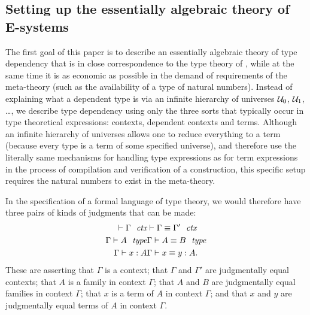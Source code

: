 \subsection*{Setting up the essentially algebraic theory of E-systems}
The first goal of this paper is to describe an essentially algebraic theory of
type dependency that is in close correspondence to the type theory of
\cite{TheBook}, while at the same time it is as economic as possible in the
demand of requirements of the meta-theory (such as the availability of a type of natural numbers). Instead of explaining
what a dependent type is via an infinite hierarchy of universes $\mathcal{U}_0$,
$\mathcal{U}_1$, \ldots, we describe type dependency using only the three sorts
that typically occur in type theoretical expressions: contexts, dependent contexts and 
terms. Although an infinite hierarchy of universes allows one to reduce everything
to a term (because every type is a term of some specified universe), and 
therefore use the literally same mechanisms for handling type expressions as for
term expressions in the process of compilation and verification of a 
construction, this specific setup requires the natural numbers to exist in the 
meta-theory. 

In the specification of a formal language of type theory, we would therefore
have three pairs of kinds of judgments that can be made:
\begin{align*}
\jalign\jctx{\Gamma} 
& \jalign\jctxeq{\Gamma}{\Gamma'}
  \\
\jalign\jfam{\Gamma}{A} 
& \jalign\jfameq{\Gamma}{A}{B}
  \\
\jalign\jterm{\Gamma}{A}{x} 
& \jalign\jtermeq{\Gamma}{A}{x}{y}.
\end{align*}
These are asserting that $\Gamma$ is a context; that $\Gamma$ and $\Gamma'$ are
judgmentally equal contexts; that $A$ is a family in context $\Gamma$; that
$A$ and $B$ are judgmentally equal families in context $\Gamma$; that $x$ is
a term of $A$ in context $\Gamma$; and that $x$ and $y$ are judgmentally equal
terms of $A$ in context $\Gamma$. 
 
